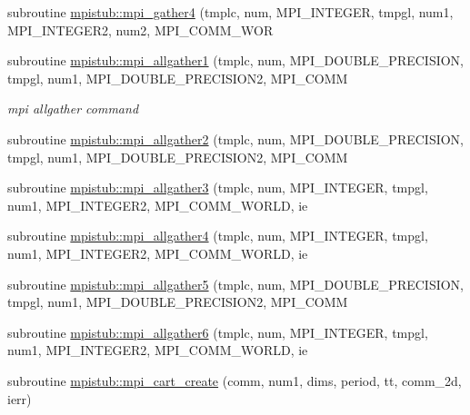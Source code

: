 \begin{DoxyCompactItemize}
\item 
subroutine \mbox{\hyperlink{namespacempistub_a6c7b2f5337f97885b72a76ec35729075}{mpistub\+::mpi\+\_\+gather4}} (tmplc, num, M\+P\+I\+\_\+\+I\+N\+T\+E\+G\+ER, tmpgl, num1, M\+P\+I\+\_\+\+I\+N\+T\+E\+G\+E\+R2, num2, M\+P\+I\+\_\+\+C\+O\+M\+M\+\_\+\+W\+OR
\item 
subroutine \mbox{\hyperlink{namespacempistub_a61c97c834a766b0372d758a4158ae7da}{mpistub\+::mpi\+\_\+allgather1}} (tmplc, num, M\+P\+I\+\_\+\+D\+O\+U\+B\+L\+E\+\_\+\+P\+R\+E\+C\+I\+S\+I\+ON, tmpgl, num1, M\+P\+I\+\_\+\+D\+O\+U\+B\+L\+E\+\_\+\+P\+R\+E\+C\+I\+S\+I\+O\+N2, M\+P\+I\+\_\+\+C\+O\+MM
\begin{DoxyCompactList}\small\item\em mpi allgather command \end{DoxyCompactList}\item 
subroutine \mbox{\hyperlink{namespacempistub_a4af9ae68605228fa295ff15192cad31c}{mpistub\+::mpi\+\_\+allgather2}} (tmplc, num, M\+P\+I\+\_\+\+D\+O\+U\+B\+L\+E\+\_\+\+P\+R\+E\+C\+I\+S\+I\+ON, tmpgl, num1, M\+P\+I\+\_\+\+D\+O\+U\+B\+L\+E\+\_\+\+P\+R\+E\+C\+I\+S\+I\+O\+N2, M\+P\+I\+\_\+\+C\+O\+MM
\item 
subroutine \mbox{\hyperlink{namespacempistub_a60f773685d2ab6f25d3d674acd53d941}{mpistub\+::mpi\+\_\+allgather3}} (tmplc, num, M\+P\+I\+\_\+\+I\+N\+T\+E\+G\+ER, tmpgl, num1, M\+P\+I\+\_\+\+I\+N\+T\+E\+G\+E\+R2, M\+P\+I\+\_\+\+C\+O\+M\+M\+\_\+\+W\+O\+R\+LD, ie
\item 
subroutine \mbox{\hyperlink{namespacempistub_a2b8f9c4bef9676116ba1eeb6b4e72af5}{mpistub\+::mpi\+\_\+allgather4}} (tmplc, num, M\+P\+I\+\_\+\+I\+N\+T\+E\+G\+ER, tmpgl, num1, M\+P\+I\+\_\+\+I\+N\+T\+E\+G\+E\+R2, M\+P\+I\+\_\+\+C\+O\+M\+M\+\_\+\+W\+O\+R\+LD, ie
\item 
subroutine \mbox{\hyperlink{namespacempistub_afa6d7737a2157021051c7c4e7c159079}{mpistub\+::mpi\+\_\+allgather5}} (tmplc, num, M\+P\+I\+\_\+\+D\+O\+U\+B\+L\+E\+\_\+\+P\+R\+E\+C\+I\+S\+I\+ON, tmpgl, num1, M\+P\+I\+\_\+\+D\+O\+U\+B\+L\+E\+\_\+\+P\+R\+E\+C\+I\+S\+I\+O\+N2, M\+P\+I\+\_\+\+C\+O\+MM
\item 
subroutine \mbox{\hyperlink{namespacempistub_ace33f6f5c0cff4120ef8d624a20adf59}{mpistub\+::mpi\+\_\+allgather6}} (tmplc, num, M\+P\+I\+\_\+\+I\+N\+T\+E\+G\+ER, tmpgl, num1, M\+P\+I\+\_\+\+I\+N\+T\+E\+G\+E\+R2, M\+P\+I\+\_\+\+C\+O\+M\+M\+\_\+\+W\+O\+R\+LD, ie
\item 
subroutine \mbox{\hyperlink{namespacempistub_ae0b8402fe840a321a5e4eabbda8ecb43}{mpistub\+::mpi\+\_\+cart\+\_\+create}} (comm, num1, dims, period, tt, comm\+\_\+2d, ierr)

\end{DoxyCompactItemize}
